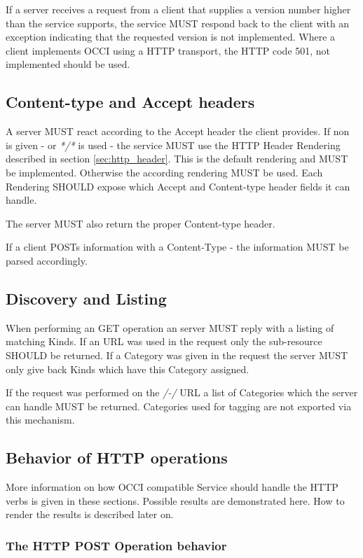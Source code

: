 \documentclass[10pt,a4paper]{article}
\begin{document}
If a server receives a request from a client that supplies a version number higher than the service supports, the service MUST respond back to the client with an exception indicating that the requested version is not implemented. Where a client implements OCCI using a HTTP transport, the HTTP code 501, not implemented should be used. 

\subsection{Content-type and Accept headers}
A server MUST react according to the Accept header the client provides. If non is given - or \textit{*/*} is used - the service MUST use the HTTP Header Rendering described in section \ref{sec:http_header}. This is the default rendering and MUST be implemented. Otherwise the according rendering MUST be used. Each Rendering SHOULD expose which Accept and Content-type header fields it can handle.

The server MUST also return the proper Content-type header. 

If a client POSTs information with a Content-Type - the information MUST be parsed accordingly.

\subsection{Discovery and Listing}
When performing an GET operation an server MUST reply with a listing of matching Kinds. If an URL was used in the request only the sub-resource SHOULD be returned. If a Category was given in the request the server MUST only give back Kinds which have this Category assigned.

If the request was performed on the \textit{/-/} URL a list of Categories which the server can handle MUST be returned. Categories used for tagging are not exported via this mechanism.

\subsection{Behavior of HTTP operations}

More information on how OCCI compatible Service should handle the HTTP verbs is given in these sections. Possible results are demonstrated here. How to render the results is described later on.

\subsubsection{The HTTP POST Operation behavior}
\end{document}
